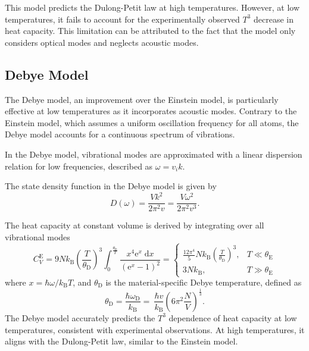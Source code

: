 This model predicts the Dulong-Petit law at high temperatures. However, 
at low temperatures, it fails to account for the experimentally observed $T^3$ 
decrease in heat capacity. This limitation can be attributed to the fact that 
the model only considers optical modes and neglects acoustic modes.

\subsection{Debye Model}

The Debye model, an improvement over the Einstein model, 
is particularly effective at low temperatures as it incorporates acoustic modes. 
Contrary to the Einstein model, which assumes a uniform oscillation frequency for all atoms, 
the Debye model accounts for a continuous spectrum of vibrations.

In the Debye model, vibrational modes are approximated with a linear dispersion relation 
for low frequencies, described as $\omega = v_i k$. 

The state density function in the Debye model is given by
\begin{equation}
    D(\omega) = \frac{Vk^2}{2\pi^2v} = \frac{V\omega^2}{2\pi^2 v^3}.
    \label{eqn:sdf}
\end{equation}

The heat capacity at constant volume is derived by integrating over all vibrational modes
\begin{equation}
    C_V^\text{E} = 9Nk_\text{B} \left(\frac{T}{\theta_\text{D}}\right)^3 \int_0^{\frac{\theta_\text{D}}{T}} 
    \frac{x^4\text{e}^x \; \text{d}x}{(\text{e}^x - 1)^2} = 
    \begin{cases}
        \frac{12\pi^4}{5}Nk_\text{B}\left(\frac{T}{\theta_\text{D}}\right)^3, & T \ll \theta_\text{E} \\
        3Nk_\text{B} , & T \gg \theta_\text{E}
    \end{cases}
\end{equation}
where  \( x = \hbar\omega / k_\text{B}T \), and
$\theta_\text{D}$ is the material-specific Debye temperature, defined as 
\begin{equation}
    \theta_\text{D} = \frac{\hbar\omega_\text{D}}{k_\text{B}} = \
    \frac{\hbar v}{k_\text{B}} \left(6\pi^2\frac{N}{V}\right)^{\frac{1}{3}}.
    \label{eqn:Debye}
\end{equation}
The Debye model accurately predicts the $T^3$ dependence of heat capacity at low temperatures, 
consistent with experimental observations. 
At high temperatures, it aligns with the Dulong-Petit law, similar to the Einstein model.

